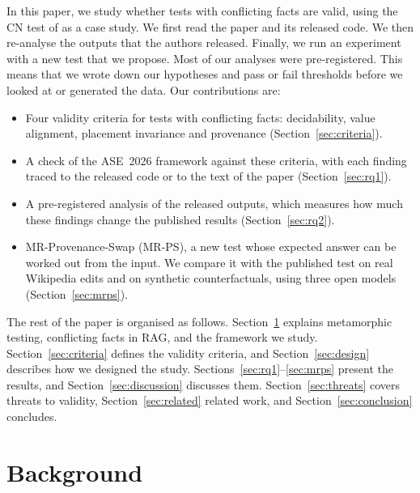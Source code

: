 \documentclass[preprint,12pt,authoryear]{elsarticle}
\newcommand{\cn}{\textsc{CN}}
\newcommand{\mrps}{\textsc{MR-PS}}
\begin{document}
In this paper, we study whether tests with conflicting facts are valid, using the \cn{} test of
\citet{kim2026knowledge} as a case study. We first read the paper and its released code. We then
re-analyse the outputs that the authors released. Finally, we run an experiment with a new test that
we propose. Most of our analyses were pre-registered. This means that we wrote down our hypotheses
and pass or fail thresholds before we looked at or generated the data. Our contributions are:
\begin{itemize}[leftmargin=*]
  \item Four validity criteria for tests with conflicting facts: decidability, value alignment,
        placement invariance and provenance (Section~\ref{sec:criteria}).
  \item A check of the ASE~2026 framework against these criteria, with each finding traced to the
        released code or to the text of the paper (Section~\ref{sec:rq1}).
  \item A pre-registered analysis of the released outputs, which measures how much these findings
        change the published results (Section~\ref{sec:rq2}).
  \item MR-Provenance-Swap (\mrps), a new test whose expected answer can be worked out from the
        input. We compare it with the published test on real Wikipedia edits and on synthetic
        counterfactuals, using three open models (Section~\ref{sec:mrps}).
\end{itemize}

The rest of the paper is organised as follows. Section~\ref{sec:background} explains metamorphic
testing, conflicting facts in RAG, and the framework we study. Section~\ref{sec:criteria} defines the
validity criteria, and Section~\ref{sec:design} describes how we designed the study.
Sections~\ref{sec:rq1}--\ref{sec:mrps} present the results, and Section~\ref{sec:discussion}
discusses them. Section~\ref{sec:threats} covers threats to validity, Section~\ref{sec:related}
related work, and Section~\ref{sec:conclusion} concludes.

\section{Background}
\label{sec:background}
\end{document}
